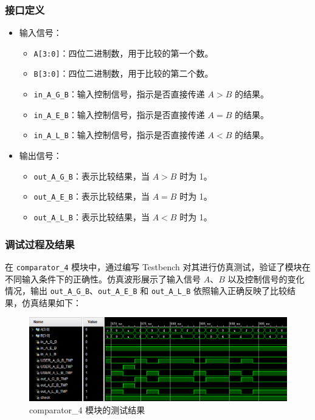 \documentclass[zihao=5, UTF8]{article}
\theoremstyle{MyLineTheoremStyle} %
\theoremstyle{MyBlockTheoremStyle} %
\theoremstyle{MySubsubsectionStyle} %
\begin{document}
\subsubsection{接口定义}
\begin{itemize}
    \item 输入信号：
    \begin{itemize}
        \item \texttt{A[3:0]}：四位二进制数，用于比较的第一个数。
        \item \texttt{B[3:0]}：四位二进制数，用于比较的第二个数。
        \item \texttt{in\_A\_G\_B}：输入控制信号，指示是否直接传递 $A > B$ 的结果。
        \item \texttt{in\_A\_E\_B}：输入控制信号，指示是否直接传递 $A = B$ 的结果。
        \item \texttt{in\_A\_L\_B}：输入控制信号，指示是否直接传递 $A < B$ 的结果。
    \end{itemize}
    \item 输出信号：
    \begin{itemize}
        \item \texttt{out\_A\_G\_B}：表示比较结果，当 $A > B$ 时为 1。
        \item \texttt{out\_A\_E\_B}：表示比较结果，当 $A = B$ 时为 1。
        \item \texttt{out\_A\_L\_B}：表示比较结果，当 $A < B$ 时为 1。
    \end{itemize}
\end{itemize}

\subsubsection{调试过程及结果}
在 \texttt{comparator\_4} 模块中，通过编写 Testbench 对其进行仿真测试，验证了模块在不同输入条件下的正确性。仿真波形展示了输入信号 $A$、$B$ 以及控制信号的变化情况，输出 \texttt{out\_A\_G\_B}、\texttt{out\_A\_E\_B} 和 \texttt{out\_A\_L\_B} 依照输入正确反映了比较结果，仿真结果如下：
\begin{figure}[htbp]
    \centering
    \includegraphics[width=\textwidth]{comparator_4.png} %
    \caption{comparator\_4 模块的测试结果}
    \label{fig:comparator_4模块的测试结果}
\end{figure}
\end{document}
